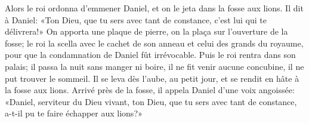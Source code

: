 Alors le roi ordonna d’emmener Daniel, et on le jeta dans la fosse aux lions.
Il dit à Daniel: «Ton Dieu, que tu sers avec tant de constance,
	c’est lui qui te délivrera!»
On apporta une plaque de pierre, on la plaça sur l’ouverture de la fosse;
	le roi la scella avec le cachet de son anneau et celui des grands du royaume,
	pour que la condamnation de Daniel fût irrévocable.
Puis le roi rentra dans son palais;
	il passa la nuit sans manger ni boire, il ne fit venir aucune concubine,
	il ne put trouver le sommeil.
Il se leva dès l’aube, au petit jour, et se rendit en hâte à la fosse aux lions.
Arrivé près de la fosse, il appela Daniel d’une voix angoissée:
	«Daniel, serviteur du Dieu vivant,
	ton Dieu, que tu sers avec tant de constance, a-t-il pu te faire échapper aux lions?»
